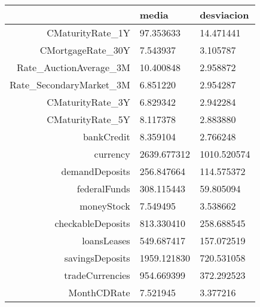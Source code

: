 \documentclass[11pt]{article}
\begin{document}
    \begin{tabular}{r|ll}
  & media & desviacion\\
\hline
	CMaturityRate\_1Y &   97.353633 &   14.471441\\
	CMortgageRate\_30Y &    7.543937 &    3.105787\\
	Rate\_AuctionAverage\_3M &   10.400848 &    2.958872\\
	Rate\_SecondaryMarket\_3M &    6.851220 &    2.954287\\
	CMaturityRate\_3Y &    6.829342 &    2.942284\\
	CMaturityRate\_5Y &    8.117378 &    2.883880\\
	bankCredit &    8.359104 &    2.766248\\
	currency & 2639.677312 & 1010.520574\\
	demandDeposits &  256.847664 &  114.575372\\
	federalFunds &  308.115443 &   59.805094\\
	moneyStock &    7.549495 &    3.538662\\
	checkableDeposits &  813.330410 &  258.688545\\
	loansLeases &  549.687417 &  157.072519\\
	savingsDeposits & 1959.121830 &  720.531058\\
	tradeCurrencies &  954.669399 &  372.292523\\
	MonthCDRate &    7.521945 &    3.377216\\
\end{tabular}
\end{document}
